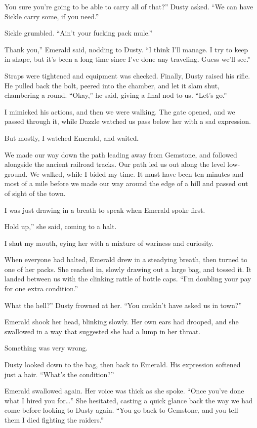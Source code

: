 \leavevmode{}You sure you’re going to be able to carry all of that?” Dusty asked. “We can have Sickle carry some, if you need.”

Sickle grumbled. “Ain’t your fucking pack mule.”

\leavevmode{}Thank you,” Emerald said, nodding to Dusty. “I think I’ll manage. I try to keep in shape, but it’s been a long time since I’ve done any traveling. Guess we’ll see.”

Straps were tightened and equipment was checked. Finally, Dusty raised his rifle. He pulled back the bolt, peered into the chamber, and let it slam shut, chambering a round. “Okay,” he said, giving a final nod to us. “Let’s go.”

I mimicked his actions, and then we were walking. The gate opened, and we passed through it, while Dazzle watched us pass below her with a sad expression.

But mostly, I watched Emerald, and waited.

We made our way down the path leading away from Gemstone, and followed alongside the ancient railroad tracks. Our path led us out along the level low-ground. We walked, while I bided my time. It must have been ten minutes and most of a mile before we made our way around the edge of a hill and passed out of sight of the town.

I was just drawing in a breath to speak when Emerald spoke first.

\leavevmode{}Hold up,” she said, coming to a halt.

I shut my mouth, eying her with a mixture of wariness and curiosity.

When everyone had halted, Emerald drew in a steadying breath, then turned to one of her packs. She reached in, slowly drawing out a large bag, and tossed it. It landed between us with the clinking rattle of bottle caps. “I’m doubling your pay for one extra condition.”

\leavevmode{}What the hell?” Dusty frowned at her. “You couldn’t have asked us in town?”

Emerald shook her head, blinking slowly. Her own ears had drooped, and she swallowed in a way that suggested she had a lump in her throat.

Something was very wrong.

Dusty looked down to the bag, then back to Emerald. His expression softened just a hair. “What’s the condition?”

Emerald swallowed again. Her voice was thick as she spoke. “Once you’ve done what I hired you for…” She hesitated, casting a quick glance back the way we had come before looking to Dusty again. “You go back to Gemstone, and you tell them I died fighting the raiders.”

